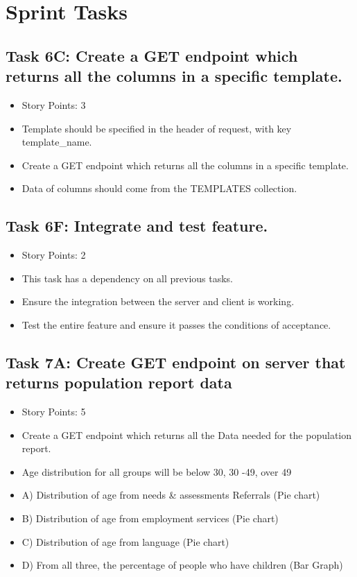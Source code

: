 \documentclass[12pt]{article}
\begin{document}
\textcolor{black}{\tableofcontents}
\pagebreak


\section{Sprint Tasks}

\subsection{Task 6C: Create a GET endpoint which returns all the columns in a specific template.}
\begin{itemize}%
\item Story Points: 3
\item Template should be specified  in the header of request, with key template\_name.
\item Create a GET endpoint which returns all the columns in a specific template.
\item Data of columns should come from the TEMPLATES collection.
\end{itemize}

\subsection{Task 6F: Integrate and test feature.}
\begin{itemize}%
\item Story Points: 2
\item This task has a dependency on all previous tasks.
\item Ensure the integration between the server and client is working.
\item Test the entire feature and ensure it passes the conditions of acceptance.
\end{itemize}

\subsection{Task 7A: Create GET endpoint on server that returns population report data}
\begin{itemize}%
\item Story Points: 5
\item Create a GET endpoint which returns all the Data needed for the population report.
\item Age distribution for all groups will be below 30, 30 -49, over 49
\item A) Distribution of age from needs \& assessments Referrals  (Pie chart)
\item B) Distribution of age from employment services (Pie chart)	
\item C) Distribution of age from language (Pie chart)
\item D) From all three, the percentage of people who have children (Bar Graph)
\end{itemize}
\end{document}

